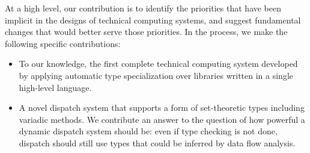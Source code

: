 \iffalse
Our first contribution is a discussion of the nature of technical computing
that suggests which language-level abstractions might best support its use
cases.
Simply put technical computing has by and large happened
without sufficient probing and analysis as to what it is.

Based on the theory that technical computing is characterized by complex
operators and particular combinations of binding time behavior.
\fi

At a high level, our contribution is to identify the priorities
that have been implicit in the designs of technical computing systems,
and suggest fundamental changes that would better serve those
priorities.
In the process, we make the following specific contributions:

\begin{itemize}
\item To our knowledge, the first complete technical computing system
developed by applying automatic type specialization over libraries
written in a single high-level language.

\item A novel dispatch system that supports a form of set-theoretic types
including variadic methods.
We contribute an answer to the question of how powerful a dynamic dispatch
system should be: even if type checking is not done, dispatch should still
use types that could be inferred by data flow analysis.






\end{itemize}
